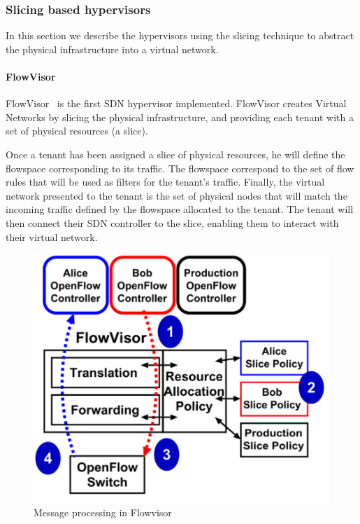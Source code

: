 \subsubsection{Slicing based hypervisors}
\label{sec:existing-nhv}
In this section we describe the hypervisors using the slicing technique to abstract the physical infrastructure into a virtual network.

\paragraph{FlowVisor}

FlowVisor~\cite{FlowVisor-Sherwood2009} is the first SDN hypervisor implemented.
FlowVisor creates Virtual Networks by slicing the physical infrastructure, and providing each tenant with a set of physical resources (\ie a slice).

Once a tenant has been assigned a slice of physical resources, he will define the flowspace 
corresponding to its traffic.
The flowspace correspond to the set of flow rules that will be used as filters for the tenant's traffic.
Finally, the virtual network presented to the tenant is the set of physical nodes that will match the incoming traffic defined by the flowspace allocated to the tenant.
The tenant will then connect their SDN controller to the slice, enabling them to interact with their virtual network.



\begin{figure}[h]
    \centering
    \includegraphics[scale=0.6]{figures/flowvisor-process.pdf}
    \caption{Message processing in Flowvisor~\cite{FlowVisor-Sherwood2009}}
    \label{fig:flowvisor-process}
\end{figure}

